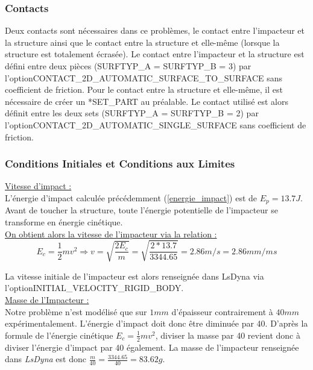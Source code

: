 \documentclass[a4paper]{article}
\begin{document}
	\subsubsection{Contacts}
	\hspace{0.5cm}Deux contacts sont nécessaires dans ce problèmes, le contact entre l'impacteur et la structure ainsi que le contact entre la structure et elle-même (lorsque la structure est totalement écrasée). Le contact entre l'impacteur et la structure est défini entre deux pièces (SURFTYP\_A = SURFTYP\_B = 3) par l'option\newline *CONTACT\_2D\_AUTOMATIC\_SURFACE\_TO\_SURFACE sans coefficient de friction. Pour le contact entre la structure et elle-même, il est nécessaire de créer un *SET\_PART au préalable. Le contact utilisé est alors définit entre les deux sets (SURFTYP\_A = SURFTYP\_B = 2) par l'option\newline  *CONTACT\_2D\_AUTOMATIC\_SINGLE\_SURFACE sans coefficient de friction.
	
	\subsubsection{Conditions Initiales et Conditions aux Limites}
	\hspace{0.5cm}\underline{Vitesse d'impact :}\\
	
	\hspace{0.5cm}L'énergie d'impact calculée précédemment (\ref{energie_impact}) est de $E_{p} = 13.7 J$. Avant de toucher la structure, toute l'énergie potentielle de l'impacteur se transforme en énergie cinétique.\\
	
	\underline{On obtient alors la vitesse de l'impacteur via la relation :}
	$$E_{c} = \frac{1}{2}mv^{2} \Rightarrow v = \sqrt{\frac{2E_{c}}{m}} = \sqrt{\frac{2 * 13.7}{3344.65}} = 2.86 m/s = 2.86 mm/ms$$
	
	La vitesse initiale de l'impacteur est alors renseignée dans LsDyna via l'option\newline *INITIAL\_VELOCITY\_RIGID\_BODY.\\
	
	\underline{Masse de l'Impacteur :}\\
	
	Notre problème n'est modélisé que sur $1 mm$ d'épaisseur contrairement à $40 mm$ expérimentalement. L'énergie d'impact doit donc être diminuée par 40. D'après la formule de l'énergie cinétique $E_{c} = \frac{1}{2}mv^{2}$, diviser la masse par 40 revient donc à diviser l'énergie d'impact par 40 également. La masse de l'impacteur renseignée dans \textit{LsDyna} est donc $\frac{m}{40} = \frac{3344.65}{40} = 83.62 g$.\\
	
\end{document}
